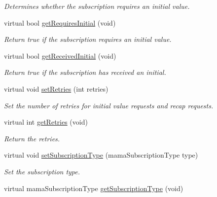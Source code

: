 \begin{DoxyCompactItemize}
\begin{DoxyCompactList}\small\item\em Determines whether the subscription requires an initial value. \item\end{DoxyCompactList}\item 
virtual bool \hyperlink{classWombat_1_1MamaSubscription_adc672602e7ac6ecff5ac6709ebfa1d08}{getRequiresInitial} (void)
\begin{DoxyCompactList}\small\item\em Return true if the subscription requires an initial value. \item\end{DoxyCompactList}\item 
virtual bool \hyperlink{classWombat_1_1MamaSubscription_a421a096d393f93dd73cdeca5f2b047cc}{getReceivedInitial} (void)
\begin{DoxyCompactList}\small\item\em Return true if the subscription has received an initial. \item\end{DoxyCompactList}\item 
virtual void \hyperlink{classWombat_1_1MamaSubscription_ac6928358bc84c88edef730cd8f8f0f18}{setRetries} (int retries)
\begin{DoxyCompactList}\small\item\em Set the number of retries for initial value requests and recap requests. \item\end{DoxyCompactList}\item 
virtual int \hyperlink{classWombat_1_1MamaSubscription_a09f887c5c0768110e58c65143979dbf5}{getRetries} (void)
\begin{DoxyCompactList}\small\item\em Return the retries. \item\end{DoxyCompactList}\item 
virtual void \hyperlink{classWombat_1_1MamaSubscription_ae3a076d82e2e53d03e7414749333b65c}{setSubscriptionType} (mamaSubscriptionType type)
\begin{DoxyCompactList}\small\item\em Set the subscription type. \item\end{DoxyCompactList}\item 
virtual mamaSubscriptionType \hyperlink{classWombat_1_1MamaSubscription_ad156d5629d85a95c9d6e64dfe871aa97}{getSubscriptionType} (void)

\end{DoxyCompactItemize}
